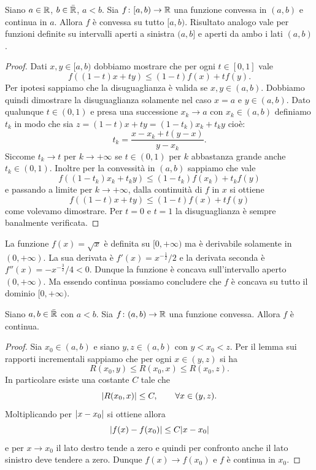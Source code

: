 \begin{theorem}
Siano $a\in \mathbb R$, $b\in \bar {\mathbb R}$, $a<b$.
Sia $f\colon [a,b)\to \mathbb R$ una funzione convessa in $(a,b)$ e continua in $a$. Allora $f$ è convessa su tutto $[a,b)$. Risultato analogo vale per funzioni definite su intervalli aperti a sinistra $(a,b]$
e aperti da ambo i lati $(a,b)$.
\end{theorem}
%
\begin{proof}
Dati $x,y \in [a,b)$ dobbiamo mostrare che per ogni $t\in[0,1]$ vale
\[
f((1-t) x+ t y) \le (1-t)f(x) + t f(y).
\]
Per ipotesi sappiamo che la disuguaglianza è valida se $x,y \in (a,b)$. Dobbiamo quindi dimostrare la disuguaglianza solamente nel caso $x=a$ e $y\in(a,b)$. Dato qualunque $t\in (0,1)$ e
presa una successione $x_k \to a$ con $x_k\in (a,b)$ definiamo
$t_k$ in modo che sia $z = (1-t)x + ty = (1-t_k) x_k + t_k y$
cioè:
\[
  t_k = \frac{x - x_k + t(y-x)}{y-x_k}.
\]
Siccome $t_k\to t$ per $k\to +\infty$ se $t\in (0,1)$ per $k$ abbastanza grande anche $t_k\in(0,1)$. Inoltre per la convessità in $(a,b)$ sappiamo che vale
\[
  f((1-t_k)x_k + t_k y) \le (1-t_k) f(x_k) + t_k f(y)
\]
e passando a limite per $k\to +\infty$, dalla continuità di $f$ in $x$ si ottiene
\[
   f((1-t)x+ty) \le (1-t) f(x) + t f(y)
\]
come volevamo dimostrare. Per $t=0$ e $t=1$ la disuguaglianza è sempre banalmente verificata.
\end{proof}

\begin{example}
La funzione $f(x) = \sqrt{x}$ è definita su $[0,+\infty)$ ma è derivabile solamente in $(0,+\infty)$. La sua derivata è $f'(x) = x^{-\frac 1 2 }/2$ e la derivata seconda è $f''(x) = -x^{-\frac 3 2}/4 < 0$. Dunque la funzione è concava sull'intervallo aperto $(0,+\infty)$. Ma essendo continua possiamo concludere che $f$ è concava su tutto il dominio $[0,+\infty)$.
\end{example}

\begin{theorem}
Siano $a,b \in \bar {\mathbb R}$ con $a< b$.
Sia $f\colon (a,b) \to \mathbb R$ una funzione convessa. Allora $f$ è continua.
\end{theorem}
%
\begin{proof}
Sia $x_0 \in (a,b)$ e siano $y,z \in (a,b)$ con $y < x_0 < z$.
Per il lemma sui rapporti incrementali sappiamo che per ogni $x\in (y,z)$ si ha
\[
   R(x_0, y) \le R(x_0,x) \le R(x_0,z).
\]
In particolare esiste una costante $C$ tale che
\[
  {\left|R(x_0,x)\right|} \le C,\qquad \forall x \in (y,z).
\]
Moltiplicando per ${\left|x-x_0\right|}$ si ottiene allora
\[
   {\left|f(x) - f(x_0)\right|} \le C {\left|x-x_0\right|}
\]
e per $x\to x_0$ il lato destro tende a zero e quindi per confronto anche il lato sinistro deve tendere a zero. Dunque $f(x)\to f(x_0)$
e $f$ è continua in $x_0$.
\end{proof}

